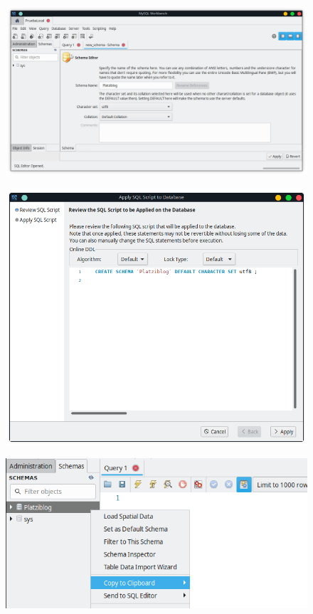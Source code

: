 \documentclass{article}
\begin{document}
\begin{figure}[h!]
  \centering
  \includegraphics[scale=0.55]{./Pictures/039_create_schema.png}
\end{figure}

\newpage

\begin{figure}[h!]
  \centering
  \includegraphics[scale=0.65]{./Pictures/040_create_schema.png}
\end{figure}

\begin{figure}[h!]
  \centering
  \includegraphics[scale=0.65]{./Pictures/041_create_schema.png}
\end{figure}
\end{document}
